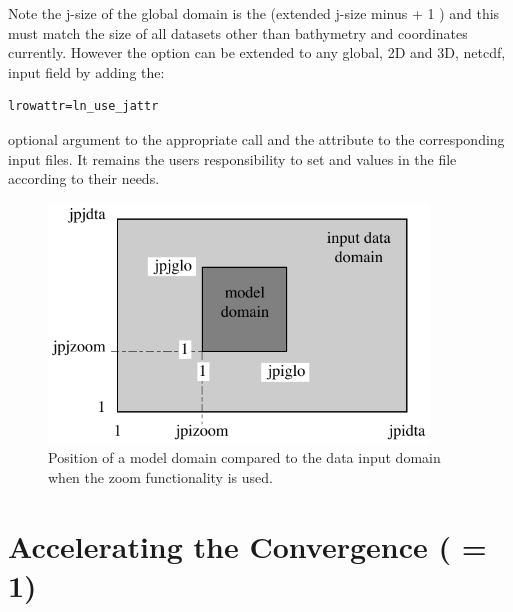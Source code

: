 \noindent Note the j-size of the global domain is the (extended j-size minus
 + 1 ) and this must match the size of all datasets other than
bathymetry and coordinates currently. However the option can be extended to any global, 2D
and 3D, netcdf, input field by adding the:
\vspace{-10pt}
\begin{alltt}
\tiny
\begin{verbatim}
lrowattr=ln_use_jattr
\end{verbatim}
\end{alltt}
optional argument to the appropriate  call and the  attribute to the corresponding input files. It remains the users responsibility to set  and  values in the  file according to their needs.

\begin{figure}[!ht] 	  \begin{center}
\includegraphics[width=0.90\textwidth]{./TexFiles/Figures/Fig_LBC_zoom.pdf}
\caption{	\label{Fig_LBC_zoom}
Position of a model domain compared to the data input domain when the zoom functionality is used.}
\end{center}   \end{figure}


\section{Accelerating the Convergence ( = 1)}
\label{MISC_acc}

